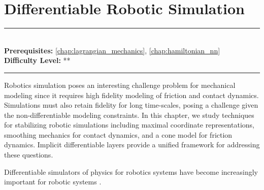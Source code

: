 \documentclass[book.tex]{subfiles}
\begin{document}
\chapter{Differentiable Robotic Simulation}
\label{chap:lagrangian_nn}
\noindent\rule{11cm}{0.4pt} \\
\textbf{Prerequisites:} \autoref{chap:lagrangian_mechanics}, \autoref{chap:hamiltonian_nn} \\
\textbf{Difficulty Level:} ** \\
\noindent\rule{11cm}{0.4pt}
\vspace{5mm}

Robotics simulation poses an interesting challenge problem for mechanical modeling since it requires high fidelity modeling of friction and contact dynamics. Simulations must also retain fidelity for long time-scales, posing a challenge given the non-differentiable modeling constraints. In this chapter, we study techniques for stabilizing robotic simulations including maximal coordinate representations, smoothing mechanics for contact dynamics, and a cone model for friction dynamics. Implicit differentiable layers provide a unified framework for addressing these questions.


Differentiable simulators of physics for robotics systems have become increasingly important for robotic systems \cite{howell2022dojo}.
\end{document}
